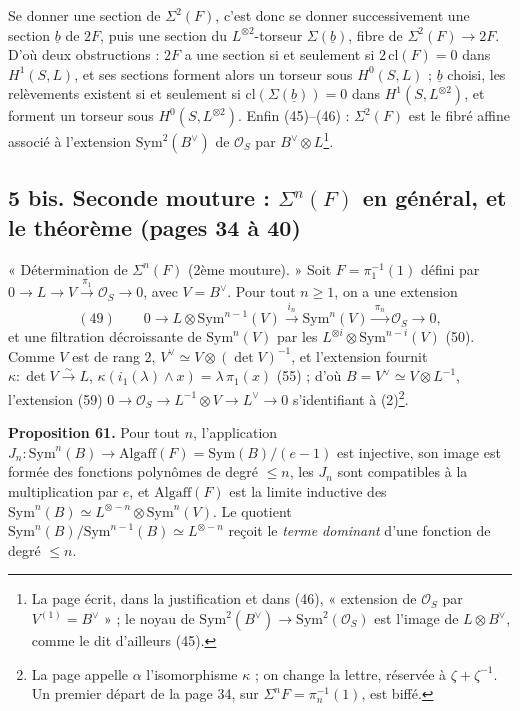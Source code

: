 \documentclass[11pt,a4paper]{article}
\begin{document}
Se donner une section de $\Sigma^2(F)$, c'est donc se donner successivement une
section $\underline{b}$ de $2F$, puis une section du $L^{\otimes 2}$-torseur
$\Sigma(\underline{b})$, fibre de $\Sigma^2(F) \to 2F$. D'où deux obstructions :
$2F$ a une section si et seulement si $2\,\mathrm{cl}(F) = 0$ dans $H^1(S, L)$, et ses
sections forment alors un torseur sous $H^0(S, L)$ ; $\underline{b}$ choisi, les
relèvements existent si et seulement si $\mathrm{cl}(\Sigma(\underline{b})) = 0$
dans $H^1(S, L^{\otimes 2})$, et forment un torseur sous $H^0(S, L^{\otimes 2})$.
Enfin (45)--(46) : $\Sigma^2(F)$ est le fibré affine associé à l'extension
$\mathrm{Sym}^2(B^{\vee})$ de $\mathcal{O}_S$ par $B^{\vee} \otimes L$\footnote{La page
écrit, dans la justification et dans (46), « extension de $\mathcal{O}_S$ par
$V^{(1)} = B^{\vee}$ » ; le noyau de $\mathrm{Sym}^2(B^{\vee}) \to
\mathrm{Sym}^2(\mathcal{O}_S)$ est l'image de $L \otimes B^{\vee}$, comme le dit
d'ailleurs (45).}.

\subsection*{5 bis. Seconde mouture : $\Sigma^n(F)$ en général, et le théorème (pages 34 à 40)}

« Détermination de $\Sigma^n(F)$ (2ème mouture). » Soit $F = \pi_1^{-1}(1)$ défini
par $0 \to L \to V \xrightarrow{\pi_1} \mathcal{O}_S \to 0$, avec $V = B^{\vee}$.
Pour tout $n \geq 1$, on a une extension
\[
  (49) \qquad 0 \to L \otimes \mathrm{Sym}^{n-1}(V) \xrightarrow{\ i_n\ }
  \mathrm{Sym}^n(V) \xrightarrow{\ \pi_n\ } \mathcal{O}_S \to 0,
\]
et une filtration décroissante de $\mathrm{Sym}^n(V)$ par les $L^{\otimes i} \otimes
\mathrm{Sym}^{n-i}(V)$ (50). Comme $V$ est de rang $2$, $V^{\vee} \simeq V \otimes
(\det V)^{-1}$, et l'extension fournit $\kappa : \det V \xrightarrow{\sim} L$,
$\kappa(i_1(\lambda) \wedge x) = \lambda\,\pi_1(x)$ (55) ; d'où $B = V^{\vee} \simeq V
\otimes L^{-1}$, l'extension (59) $0 \to \mathcal{O}_S \to L^{-1} \otimes V \to
L^{\vee} \to 0$ s'identifiant à (2)\footnote{La page appelle $\alpha$
l'isomorphisme $\kappa$ ; on change la lettre, réservée à $\zeta + \zeta^{-1}$. Un
premier départ de la page 34, sur $\Sigma^n F = \pi_n^{-1}(1)$, est biffé.}.

\textbf{Proposition 61.} Pour tout $n$, l'application $J_n :
\mathrm{Sym}^n(B) \to \mathrm{Algaff}(F) = \mathrm{Sym}(B)/(e - 1)$ est injective, son
image est formée des fonctions polynômes de degré $\leq n$, les $J_n$ sont
compatibles à la multiplication par $e$, et $\mathrm{Algaff}(F)$ est la limite
inductive des $\mathrm{Sym}^n(B) \simeq L^{\otimes -n} \otimes \mathrm{Sym}^n(V)$. Le
quotient $\mathrm{Sym}^n(B)/\mathrm{Sym}^{n-1}(B) \simeq L^{\otimes -n}$ reçoit le
\emph{terme dominant} d'une fonction de degré $\leq n$.
\end{document}
